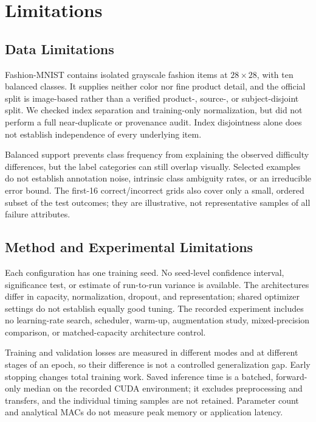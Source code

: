 \section{Limitations}
\label{sec:limitations}

\subsection{Data Limitations}

Fashion-MNIST contains isolated grayscale fashion items at $28\times28$, with ten balanced classes. It supplies neither color nor fine product detail, and the official split is image-based rather than a verified product-, source-, or subject-disjoint split. We checked index separation and training-only normalization, but did not perform a full near-duplicate or provenance audit. Index disjointness alone does not establish independence of every underlying item.

Balanced support prevents class frequency from explaining the observed difficulty differences, but the label categories can still overlap visually. Selected examples do not establish annotation noise, intrinsic class ambiguity rates, or an irreducible error bound. The first-16 correct/incorrect grids also cover only a small, ordered subset of the test outcomes; they are illustrative, not representative samples of all failure attributes.

\subsection{Method and Experimental Limitations}

Each configuration has one training seed. No seed-level confidence interval, significance test, or estimate of run-to-run variance is available. The architectures differ in capacity, normalization, dropout, and representation; shared optimizer settings do not establish equally good tuning. The recorded experiment includes no learning-rate search, scheduler, warm-up, augmentation study, mixed-precision comparison, or matched-capacity architecture control.

Training and validation losses are measured in different modes and at different stages of an epoch, so their difference is not a controlled generalization gap. Early stopping changes total training work. Saved inference time is a batched, forward-only median on the recorded CUDA environment; it excludes preprocessing and transfers, and the individual timing samples are not retained. Parameter count and analytical MACs do not measure peak memory or application latency.

